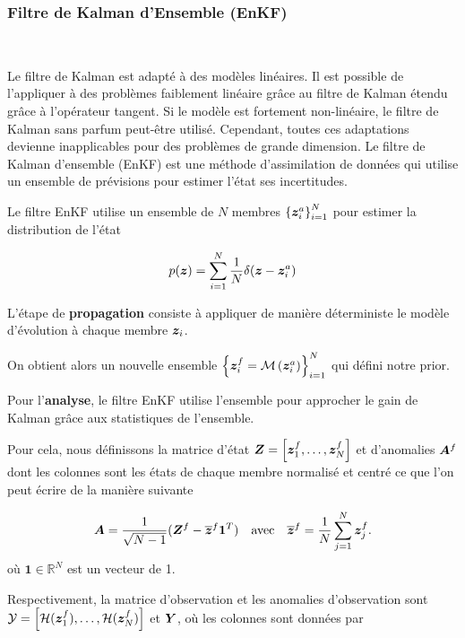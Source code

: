 \subsubsection{Filtre de Kalman d'Ensemble (EnKF)}~\label{sec:enkf}

Le filtre de Kalman est adapté à des modèles linéaires. Il est possible de l'appliquer à des problèmes faiblement linéaire grâce au filtre de Kalman étendu grâce à l'opérateur tangent. Si le modèle est fortement non-linéaire, le filtre de Kalman sans parfum peut-être utilisé. Cependant, toutes ces adaptations devienne inapplicables pour des problèmes de grande dimension.
Le filtre de Kalman d'ensemble (EnKF) est une méthode d'assimilation de données qui utilise un ensemble de prévisions pour estimer l'état ses incertitudes.

Le filtre EnKF utilise un ensemble de $N$ membres $\left\{\bm {\bm{z}}^a_i \right\}_{i=1}^N$ pour estimer la distribution de l'état

\begin{equation*}
    p(\bm{z}) = \sum_{i=1}^{N} \frac{1}{N} \delta(\bm z - \bm z^a_i)
\end{equation*}

L'étape de \textbf{propagation} consiste à appliquer de manière déterministe le modèle d'évolution à chaque membre $\bm z_i$.

On obtient alors un nouvelle ensemble $\left\{\bm {\bm{z}}^f_{i}= \mathcal M\left(\bm z_i^a\right) \right\}_{i=1}^N$ qui défini notre prior.

Pour l'\textbf{analyse}, le filtre EnKF utilise l'ensemble pour approcher le gain de Kalman grâce aux statistiques de l'ensemble.

Pour cela, nous définissons la matrice d'état $\bm{Z} = \left[\bm{z}^f_1, \dots, \bm{z}^f_N\right]$ et d’anomalies $\bm A^f$ dont les colonnes sont les états de chaque membre normalisé et centré ce que l'on peut écrire de la manière suivante

\begin{equation*}
    \bm A = \frac{1}{\sqrt{N - 1}}(\bm Z^f - \overline{\bm{z}}^f \bm{1}^T) \quad \text{avec} \quad \overline{\bm{z}}^f = \frac{1}{N} \sum_{j=1}^{N} \bm{z}_j^f.
\end{equation*}où $\bm{1} \in \mathbb{R}^N$ est un vecteur de 1.

Respectivement, la matrice d'observation et les anomalies d'observation sont $\mathcal Y = \left[\mathcal{H}(\bm{z}_1^f), \dots, \mathcal{H}(\bm{z}_N^f)\right]$ et $\bm Y$, où les colonnes sont données par

